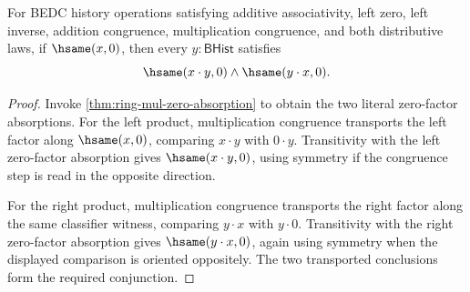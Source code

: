 \begin{theorem}
\label{thm:ring-zero-classifier-factor-absorption}
For BEDC history operations satisfying additive associativity, left zero, left
inverse, addition congruence, multiplication congruence, and both distributive
laws, if $\hsame(x,0)$, then every $y:\mathsf{BHist}$ satisfies
$$
\hsame(x\cdot y,0)\land \hsame(y\cdot x,0).
$$
\end{theorem}
\begin{proof}
Invoke \autoref{thm:ring-mul-zero-absorption} to obtain the two literal
zero-factor absorptions. For the left product, multiplication congruence
transports the left factor along $\hsame(x,0)$, comparing $x\cdot y$ with
$0\cdot y$. Transitivity with the left zero-factor absorption gives
$\hsame(x\cdot y,0)$, using symmetry if the congruence step is read in the
opposite direction.

For the right product, multiplication congruence transports the right factor
along the same classifier witness, comparing $y\cdot x$ with $y\cdot0$.
Transitivity with the right zero-factor absorption gives $\hsame(y\cdot x,0)$,
again using symmetry when the displayed comparison is oriented oppositely.
The two transported conclusions form the required conjunction.
\end{proof}

